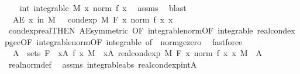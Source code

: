 \begin{isabellebody}
\ \ \isamarkupfalse%
\ int{\isacharcolon}{\kern0pt}\ {\isachardoublequoteopen}integrable\ M\ {\isacharparenleft}{\kern0pt}{\isasymlambda}x{\isachardot}{\kern0pt}\ norm\ {\isacharparenleft}{\kern0pt}f\ x{\isacharparenright}{\kern0pt}{\isacharparenright}{\kern0pt}{\isachardoublequoteclose}\ \isamarkupfalse%
\ assms\ \isamarkupfalse%
\ blast\isanewline
\ \ \isamarkupfalse%
\ {\isacharasterisk}{\kern0pt}{\isacharcolon}{\kern0pt}\ {\isachardoublequoteopen}AE\ x\ in\ M{\isachardot}{\kern0pt}\ {}\ {\isasymle}\ cond{\isacharunderscore}{\kern0pt}exp\ M\ F\ {\isacharparenleft}{\kern0pt}{\isasymlambda}x{\isachardot}{\kern0pt}\ norm\ {\isacharparenleft}{\kern0pt}f\ x{\isacharparenright}{\kern0pt}{\isacharparenright}{\kern0pt}\ x{\isachardoublequoteclose}\ \isamarkupfalse%
\ cond{\isacharunderscore}{\kern0pt}exp{\isacharunderscore}{\kern0pt}real{\isacharbrackleft}{\kern0pt}THEN\ AE{\isacharunderscore}{\kern0pt}symmetric{\isacharcomma}{\kern0pt}\ OF\ integrable{\isacharunderscore}{\kern0pt}norm{\isacharbrackleft}{\kern0pt}OF\ integrable{\isacharbrackright}{\kern0pt}{\isacharbrackright}{\kern0pt}\ real{\isacharunderscore}{\kern0pt}cond{\isacharunderscore}{\kern0pt}exp{\isacharunderscore}{\kern0pt}ge{\isacharunderscore}{\kern0pt}c{\isacharbrackleft}{\kern0pt}OF\ integrable{\isacharunderscore}{\kern0pt}norm{\isacharbrackleft}{\kern0pt}OF\ integrable{\isacharbrackright}{\kern0pt}{\isacharcomma}{\kern0pt}\ of\ {}{\isacharbrackright}{\kern0pt}\ norm{\isacharunderscore}{\kern0pt}ge{\isacharunderscore}{\kern0pt}zero\ \isamarkupfalse%
\ fastforce\isanewline
\ \ \isamarkupfalse%
\ {\isacharasterisk}{\kern0pt}{\isacharasterisk}{\kern0pt}{\isacharcolon}{\kern0pt}\ {\isachardoublequoteopen}A\ {\isasymin}\ sets\ F\ {\isasymLongrightarrow}\ {\isasymintegral}x{\isasymin}A{\isachardot}{\kern0pt}\ {\isasymbar}f\ x{\isasymbar}\ {\isasympartial}M\ {\isacharequal}{\kern0pt}\ {\isasymintegral}x{\isasymin}A{\isachardot}{\kern0pt}\ real{\isacharunderscore}{\kern0pt}cond{\isacharunderscore}{\kern0pt}exp\ M\ F\ {\isacharparenleft}{\kern0pt}{\isasymlambda}x{\isachardot}{\kern0pt}\ norm\ {\isacharparenleft}{\kern0pt}f\ x{\isacharparenright}{\kern0pt}{\isacharparenright}{\kern0pt}\ x\ {\isasympartial}M{\isachardoublequoteclose}\ \ A\ \isamarkupfalse%
\ real{\isacharunderscore}{\kern0pt}norm{\isacharunderscore}{\kern0pt}def\ \isamarkupfalse%
\ assms\ integrable{\isacharunderscore}{\kern0pt}abs\ real{\isacharunderscore}{\kern0pt}cond{\isacharunderscore}{\kern0pt}exp{\isacharunderscore}{\kern0pt}intA\ \isamarkupfalse%

\end{isabellebody}
